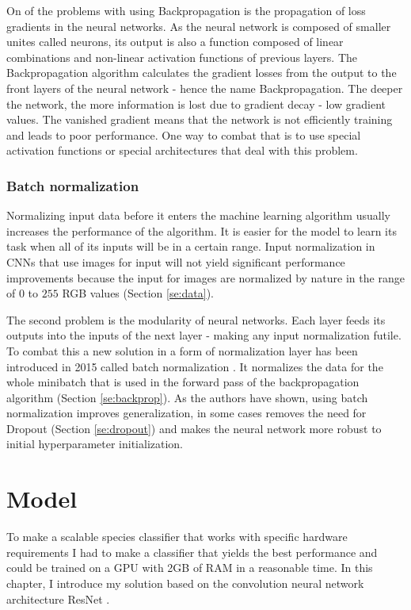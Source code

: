 \documentclass[times, utf8, diplomski]{fer}
\begin{document}
On of the problems with using Backpropagation is the propagation of loss gradients in the neural networks. As the neural network is composed of smaller unites called neurons, its output is also a function composed of linear combinations and non-linear activation functions of previous layers. The Backpropagation algorithm calculates the gradient losses from the output to the front layers of the neural network - hence the name Backpropagation. The deeper the network, the more information is lost due to gradient decay - low gradient values. The vanished gradient means that the network is not efficiently training and leads to poor performance. One way to combat that is to use special activation functions \citep{clevert_fast_2015, xu_empirical_2015, he_delving_2015} or special architectures \citep{he_deep_2016} that deal with this problem. 


\subsection{Batch normalization}
\label{se:batch_norm}

Normalizing input data before it enters the machine learning algorithm usually increases the performance of the algorithm. It is easier for the model to learn its task when all of its inputs will be in a certain range. Input normalization in CNNs that use images for input will not yield significant performance improvements because the input for images are normalized by nature in the range of $0$ to $255$ RGB values (Section \ref{se:data}). 

The second problem is the modularity of neural networks. Each layer feeds its outputs into the inputs of the next layer - making any input normalization futile. To combat this a new solution in a form of normalization layer has been introduced in 2015 called batch normalization \citep{ioffe_batch_2015}. It normalizes the data for the whole minibatch that is used in the forward pass of the backpropagation algorithm (Section \ref{se:backprop}). As the authors have shown, using batch normalization improves generalization, in some cases removes the need for Dropout (Section \ref{se:dropout}) and makes the neural network more robust to initial hyperparameter initialization.

\chapter{Model}
\label{se:model}
To make a scalable species classifier that works with specific hardware requirements I had to make a classifier that yields the best performance and could be trained on a GPU with 2GB of RAM in a reasonable time. In this chapter, I introduce my solution based on the convolution neural network architecture ResNet \citep{he_deep_2016}.
\end{document}
